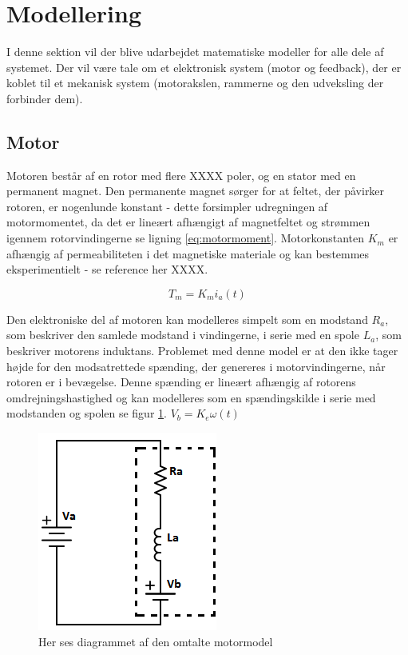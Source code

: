 \section{Modellering}
I denne sektion vil der blive udarbejdet matematiske modeller for alle dele af systemet. Der vil være tale om et elektronisk system (motor og feedback), der er koblet til et mekanisk system (motorakslen, rammerne og den udveksling der forbinder dem). 

\subsection{Motor}
Motoren består af en rotor med flere XXXX poler, og en stator med en permanent magnet. Den permanente magnet sørger for at feltet, der påvirker rotoren, er nogenlunde konstant - dette forsimpler udregningen af motormomentet, da det er lineært afhængigt af magnetfeltet og strømmen igennem rotorvindingerne se ligning \ref{eq:motormoment}. Motorkonstanten $K_{m}$ er afhængig af permeabiliteten i det magnetiske materiale og kan bestemmes eksperimentielt - se reference her XXXX.

\begin{equation}\label{eq:motormoment}
T_{m}=K_{m}i_{a}(t)
\end{equation}

Den elektroniske del af motoren kan modelleres simpelt som en modstand $R_{a}$, som beskriver den samlede modstand i vindingerne, i serie med en spole $L_{a}$, som beskriver motorens induktans. Problemet med denne model er at den ikke tager højde for den modsatrettede spænding, der genereres i motorvindingerne, når rotoren er i bevægelse. Denne spænding er lineært afhængig af rotorens omdrejningshastighed og kan modelleres som en spændingskilde i serie med modstanden og spolen se figur \ref{fig:motor_sch}. $V_{b}=K_{e}\omega(t)$

\begin{figure}
\vspace{-20pt}
	\begin{center}
	\includegraphics[scale=0.9]{Billeder/Motormodel.png}
	\end{center}
	\vspace{-10pt}
	\label{fig:motor_sch}
	\caption{Her ses diagrammet af den omtalte motormodel}
\vspace{-20pt}
\end{figure}

